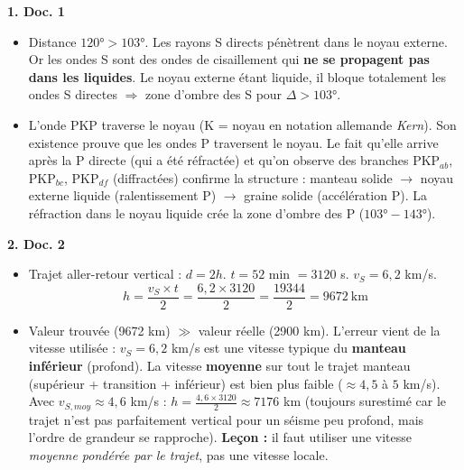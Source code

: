\documentclass[11pt]{article}
\begin{document}
\begin{corrige}
\textbf{1. Doc. 1}
\begin{itemize}
\item[a)] Distance $120° > 103°$. Les rayons S directs pénètrent dans le noyau externe. Or les ondes S sont des ondes de cisaillement qui \textbf{ne se propagent pas dans les liquides}. Le noyau externe étant liquide, il bloque totalement les ondes S directes $\Rightarrow$ zone d'ombre des S pour $\Delta > 103°$.
\item[b)] L'onde PKP traverse le noyau (K = noyau en notation allemande \emph{Kern}). Son existence prouve que les ondes P traversent le noyau. Le fait qu'elle arrive après la P directe (qui a été réfractée) et qu'on observe des branches PKP$_{ab}$, PKP$_{bc}$, PKP$_{df}$ (diffractées) confirme la structure : manteau solide $\to$ noyau externe liquide (ralentissement P) $\to$ graine solide (accélération P). La réfraction dans le noyau liquide crée la zone d'ombre des P ($103°-143°$).
\end{itemize}

\textbf{2. Doc. 2}
\begin{itemize}
\item[a)] Trajet aller-retour vertical : $d = 2h$. $t = 52$ min $= 3120$ s. $v_S = 6,2$ km/s.
\[ h = \dfrac{v_S \times t}{2} = \dfrac{6{,}2 \times 3120}{2} = \dfrac{19344}{2} = 9672~\text{km} \]
\item[b)] Valeur trouvée (9672 km) $\gg$ valeur réelle (2900 km). L'erreur vient de la vitesse utilisée : $v_S = 6,2$ km/s est une vitesse typique du \textbf{manteau inférieur} (profond). La vitesse \textbf{moyenne} sur tout le trajet manteau (supérieur + transition + inférieur) est bien plus faible ($\approx 4,5$ à $5$ km/s). Avec $v_{S,moy} \approx 4,6$ km/s : $h = \frac{4,6 \times 3120}{2} \approx 7176$ km (toujours surestimé car le trajet n'est pas parfaitement vertical pour un séisme peu profond, mais l'ordre de grandeur se rapproche). \textbf{Leçon :} il faut utiliser une vitesse \emph{moyenne pondérée par le trajet}, pas une vitesse locale.
\end{itemize}


\end{corrige}
\end{document}
